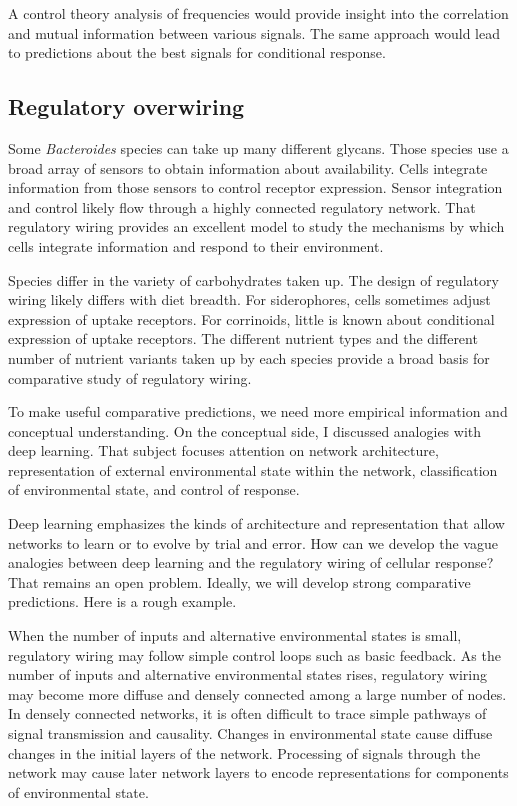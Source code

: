 \documentclass[\mydocfontsize]{article}
\begin{document}
\begin{multicols}{2}
A control theory analysis of frequencies would provide insight into the correlation and mutual information between various signals. The same approach would lead to predictions about the best signals for conditional response. 

\subsection{Regulatory overwiring}

Some \textit{Bacteroides} species can take up many different glycans. Those species use a broad array of sensors to obtain information about availability. Cells integrate information from those sensors to control receptor expression. Sensor integration and control likely flow through a highly connected regulatory network. That regulatory wiring provides an excellent model to study the mechanisms by which cells integrate information and respond to their environment. 

Species differ in the variety of carbohydrates taken up. The design of regulatory wiring likely differs with diet breadth. For siderophores, cells sometimes adjust expression of uptake receptors. For corrinoids, little is known about conditional expression of uptake receptors. The different nutrient types and the different number of nutrient variants taken up by each species provide a broad basis for comparative study of regulatory wiring.

To make useful comparative predictions, we need more empirical information and conceptual understanding. On the conceptual side, I discussed analogies with deep learning. That subject focuses attention on network architecture, representation of external environmental state within the network, classification of environmental state, and control of response. 

Deep learning emphasizes the kinds of architecture and representation that allow networks to learn or to evolve by trial and error. How can we develop the vague analogies between deep learning and the regulatory wiring of cellular response? That remains an open problem. Ideally, we will develop strong comparative predictions. Here is a rough example. 

When the number of inputs and alternative environmental states is small, regulatory wiring may follow simple control loops such as basic feedback. As the number of inputs and alternative environmental states rises, regulatory wiring may become more diffuse and densely connected among a large number of nodes. In densely connected networks, it is often difficult to trace simple pathways of signal transmission and causality. Changes in environmental state cause diffuse changes in the initial layers of the network. Processing of signals through the network may cause later network layers to encode representations for components of environmental state. 


\end{multicols}
\end{document}
